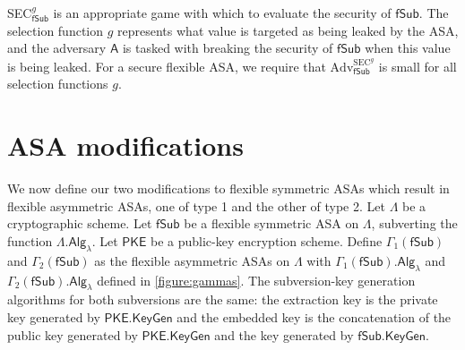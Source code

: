 SEC$^g_\mathsf{fSub}$ is an appropriate game with which to evaluate the security of $\mathsf{fSub}$. The selection function $g$ represents what value is targeted as being leaked by the ASA, and the adversary $\mathsf{A}$ is tasked with breaking the security of $\mathsf{fSub}$ when this value is being leaked. For a secure flexible ASA, we require that $\mathrm{Adv}^{\mathrm{SEC}^g}_\mathsf{fSub}$ is small for all selection functions $g$.

\section{ASA modifications}
We now define our two modifications to flexible symmetric ASAs which result in flexible asymmetric ASAs, one of type 1 and the other of type 2. Let $\mathsf{\Lambda}$ be a cryptographic scheme. Let $\mathsf{fSub}$ be a flexible symmetric ASA on $\mathsf{\Lambda}$, subverting the function $\mathsf{\Lambda.Alg}_\lambda$. Let $\mathsf{PKE}$ be a public-key encryption scheme. Define $\Gamma_1(\mathsf{fSub})$ and $\Gamma_2(\mathsf{fSub})$ as the flexible asymmetric ASAs on $\mathsf{\Lambda}$ with $\Gamma_1(\mathsf{fSub}).\mathsf{Alg}_\lambda$ and $\Gamma_2(\mathsf{fSub}).\mathsf{Alg}_\lambda$ defined in \autoref{figure:gammas}. The subversion-key generation algorithms for both subversions are the same: the extraction key is the private key generated by $\mathsf{PKE.KeyGen}$ and the embedded key is the concatenation of the public key generated by $\mathsf{PKE.KeyGen}$ and the key generated by $\mathsf{fSub.KeyGen}$.

